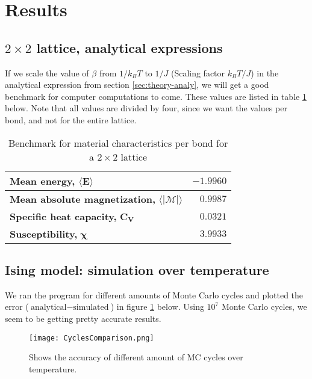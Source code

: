 \documentclass[../main.tex]{subfiles}
\begin{document}
\section{Results}
\subsection{$2 \times 2$ lattice, analytical expressions}
If we scale the value of $\beta$ from $1/k_BT$ to $1/J$ (Scaling factor $k_B T/J$) in the analytical expression from section \ref{sec:theory-analy}, we will get a good benchmark for computer computations to come. These values are listed in table \ref{tab:2x2spinsEnergiesMags} below. Note that all values are divided by four, since we want the values per bond, and not for the entire lattice.
\begin{table}[!h]
\begin{center}
  \begin{tabular}{| l | r |}
    \hline
    \textbf{Mean energy,} $\mathbf{\langle E \rangle}$ & $-1.9960$  \\
    \hline
    \textbf{Mean absolute magnetization,} $\mathbf{\langle |\mathcal{M}| \rangle}$ & $0.9987$ \\
    \hline
    \textbf{Specific heat capacity,} $\mathbf{C_V}$ & $0.0321$\\
    \hline
    \textbf{Susceptibility,} $\mathbf \chi$ & $3.9933$ \\
    \hline
  \end{tabular}
  \caption{Benchmark for material characteristics per bond for a $2 \times 2$ lattice}
  \label{tab:2x2spinsEnergiesMags}
\end{center}
\end{table}
\FloatBarrier

\subsection{Ising model: simulation over temperature}
We ran the program for different amounts of Monte Carlo cycles and plotted the error ($\text{analytical} - \text{simulated}$) in figure \ref{fig:results-MCplot} below. Using $10^7$ Monte Carlo cycles, we seem to be getting pretty accurate results.

\begin{figure}[!h]
  \texttt{[image: CyclesComparison.png]}
  \caption{Shows the accuracy of different amount of MC cycles over temperature.}
  \label{fig:results-MCplot}
\end{figure}
\FloatBarrier
\end{document}
